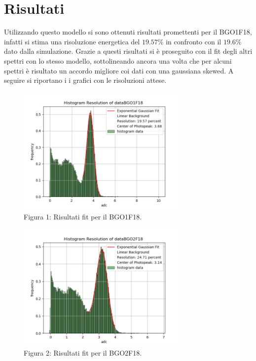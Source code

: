 \documentclass[a4paper]{article}
\begin{document}
\section{Risultati}
Utilizzando questo modello si sono ottenuti risultati promettenti per il BGO1F18, infatti si stima una risoluzione energetica del $19.57\%$ in confronto con il $19.6\%$ dato dalla simulazione. Grazie a questi risultati si è proseguito con il fit degli altri spettri con lo stesso modello, sottolineando ancora una volta che per alcuni spettri è risultato un accordo migliore coi dati con una gaussiana skewed. A seguire si riportano i i grafici con le risoluzioni attese.
\begin{figure}[H]
\centering
\includegraphics[width=0.75\textwidth]{histdataBGO1F18}
\caption{Figura 1: Risultati fit per il BGO1F18.}
\end{figure}
\begin{figure}[H]
\centering
\includegraphics[width=0.75\textwidth]{histdataBGO2F18}
\caption{Figura 2: Risultati fit per il BGO2F18.}
\end{figure}
\end{document}
